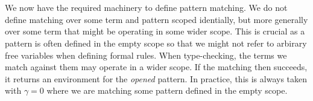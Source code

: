 {\begin{code}
\AgdaSymbol{(}\AgdaSpace{}%
\AgdaSpace{}%
\AgdaSymbol{)}%
\>[21]\AgdaSymbol{=}\AgdaSpace{}%
\AgdaSpace{}%
\AgdaSpace{}%
\AgdaSymbol{\{()\})}\<%
\\
\>[0]\AgdaSpace{}%
\AgdaSpace{}%
\AgdaSpace{}%
%
\>[21]\AgdaSymbol{=}\AgdaSpace{}%
\AgdaSpace{}%
\AgdaSpace{}%
\AgdaSymbol{\{()\})}\<%
\\
\>[0]\AgdaSpace{}%
\AgdaSpace{}%
\AgdaSpace{}%
%
\>[21]\AgdaSymbol{=}\AgdaSpace{}%
\AgdaSpace{}%
\AgdaSpace{}%
\AgdaSymbol{\{()\})}\<%
\\
%
\\[\AgdaEmptyExtraSkip]%
\>[0]\AgdaSpace{}%
\AgdaSymbol{:}\AgdaSpace{}%
\AgdaSpace{}%
\AgdaSymbol{\{}\AgdaSymbol{\}}\AgdaSpace{}%
\AgdaSpace{}%
\AgdaSpace{}%
\AgdaSymbol{\{}\AgdaSpace{}%
\AgdaSymbol{=}\AgdaSpace{}%
\AgdaSpace{}%
\AgdaSymbol{\}}\AgdaSpace{}%
\<%
\\
\>[0]\AgdaSpace{}%
\AgdaSpace{}%
\AgdaSpace{}%
\AgdaSpace{}%
\AgdaSpace{}%
\AgdaSpace{}%
\<%
\\
\>[0]\AgdaSpace{}%
\AgdaSymbol{|}\AgdaSpace{}%
\AgdaSpace{}%
\AgdaSpace{}%
\AgdaSymbol{=}\AgdaSpace{}%
\AgdaSpace{}%
\AgdaSpace{}%
\AgdaSpace{}%
\AgdaSpace{}%
\AgdaSpace{}%
\<%
\\
\>[0]\AgdaSpace{}%
\AgdaSymbol{|}\AgdaSpace{}%
\AgdaSpace{}%
\AgdaSpace{}%
\AgdaSymbol{=}\AgdaSpace{}%
\AgdaSpace{}%
\<%
\end{code}
}
We now have the required machinery to define pattern matching. We do not
define matching over some term and pattern scoped identially, but more 
generally over some term that might be operating in some wider scope. This
is crucial as a pattern is often defined in the empty scope so that we might
not refer to arbirary free variables when defining formal rules. When
type-checking, the terms we match against them may operate in a wider scope.
If the matching then succeeds, it returns an environment for the \emph{opened}
pattern. In practice, this is always taken with $γ = 0$ where we are matching
some pattern defined in the empty scope.

